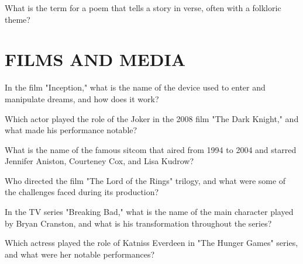 \documentclass[12pt,a4paper]{book}
\begin{document}
\begin{enhancedmcq}[Question 50]{What is the term for a poem that tells a story in verse, often with a folkloric theme?}
\end{enhancedmcq}


\section{FILMS AND MEDIA}

\begin{enhancedmcq}[Question 1]{In the film "Inception," what is the name of the device used to enter and manipulate dreams, and how does it work?}
\end{enhancedmcq}

\begin{enhancedmcq}[Question 2]{Which actor played the role of the Joker in the 2008 film "The Dark Knight," and what made his performance notable?}
\end{enhancedmcq}

\begin{enhancedmcq}[Question 3]{What is the name of the famous sitcom that aired from 1994 to 2004 and starred Jennifer Aniston, Courteney Cox, and Lisa Kudrow?}
\end{enhancedmcq}

\begin{enhancedmcq}[Question 4]{Who directed the film "The Lord of the Rings" trilogy, and what were some of the challenges faced during its production?}
\end{enhancedmcq}

\begin{enhancedmcq}[Question 5]{In the TV series "Breaking Bad," what is the name of the main character played by Bryan Cranston, and what is his transformation throughout the series?}
\end{enhancedmcq}

\begin{enhancedmcq}[Question 6]{Which actress played the role of Katniss Everdeen in "The Hunger Games" series, and what were her notable performances?}
\end{enhancedmcq}
\end{document}
